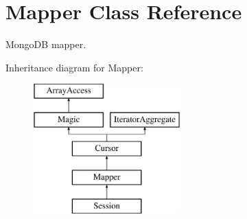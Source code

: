 \hypertarget{class_d_b_1_1_mongo_1_1_mapper}{}\section{Mapper Class Reference}
\label{class_d_b_1_1_mongo_1_1_mapper}


Mongo\+DB mapper.  


Inheritance diagram for Mapper\+:\begin{figure}[H]
\begin{center}
\leavevmode
\includegraphics[height=5.000000cm]{class_d_b_1_1_mongo_1_1_mapper}
\end{center}
\end{figure}
